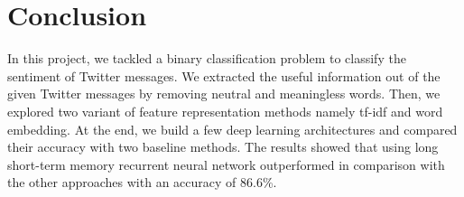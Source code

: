 \documentclass[8pt,conference,compsocconf]{IEEEtran}
\begin{document}
\section{Conclusion} \label{sec:conclusion}
In this project, we tackled a binary classification problem to classify the sentiment of Twitter messages. We extracted the useful information out of the given Twitter messages by removing neutral and meaningless words. Then, we explored two variant of feature representation methods namely tf-idf and word embedding. At the end, we build a few deep learning architectures and compared their accuracy with two baseline methods. The results showed that using long short-term memory recurrent neural network outperformed in comparison with the other approaches with an accuracy of $86.6$\%.




\end{document}
